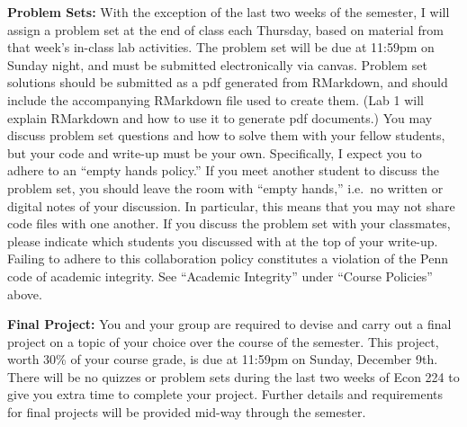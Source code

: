 \documentclass[11pt, letterpaper]{article}
\begin{document}
\medskip


\noindent \textbf{Problem Sets:} With the exception of the last two weeks of the semester, I will assign a problem set at the end of class each Thursday, based on material from that week's in-class lab activities.
The problem set will be due at 11:59pm on Sunday night, and must be submitted electronically via canvas.
Problem set solutions should be submitted as a pdf generated from RMarkdown, and should include the accompanying RMarkdown file used to create them.
(Lab 1 will explain RMarkdown and how to use it to generate pdf documents.)
You may discuss problem set questions and how to solve them with your fellow students, but your code and write-up must be your own. 
Specifically, I expect you to adhere to an ``empty hands policy.'' 
If you meet another student to discuss the problem set, you should leave the room with ``empty hands,'' i.e.\ no written or digital notes of your discussion.
In particular, this means that you may not share code files with one another.
If you discuss the problem set with your classmates, please indicate which students you discussed with at the top of your write-up.
Failing to adhere to this collaboration policy constitutes a violation of the Penn code of academic integrity.
See ``Academic Integrity'' under ``Course Policies'' above.



\medskip

\noindent \textbf{Final Project:}
You and your group are required to devise and carry out a final project on a topic of your choice over the course of the semester.
This project, worth 30\% of your course grade, is due at 11:59pm on Sunday, December 9th.
There will be no quizzes or problem sets during the last two weeks of Econ 224 to give you extra time to complete your project.
Further details and requirements for final projects will be provided mid-way through the semester.


\newpage


\end{document}
